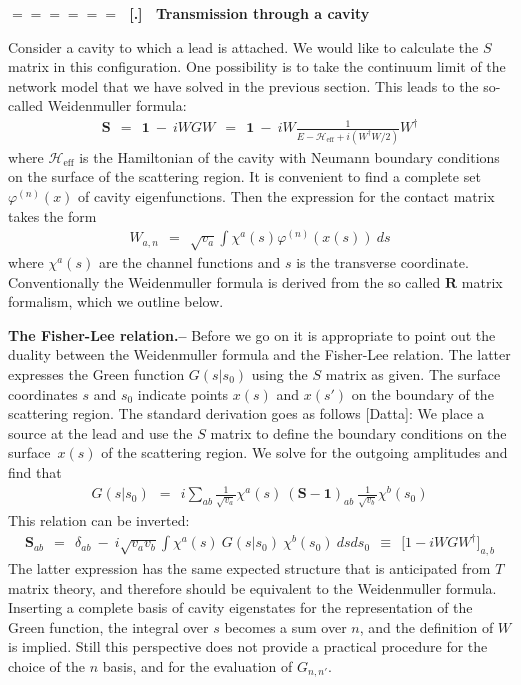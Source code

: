 \documentclass[onecolumn,fleqn]{revtex4}
\newcommand{\beq}{\begin{eqnarray}}
\newcommand{\eeq}{\end{eqnarray}}
\renewcommand{\thesubsection}{\arabic{subsection}}
\renewcommand{\thesubsubsection}{\arabic{subsubsection}}
\newcommand{\sheadC}[1]
{
\addtocounter{subsubsection}{1}
\vspace{5mm}
{\Large\bf $=\!=\!=\!=\!=\!=\;$ [\thesubsection.\thesubsubsection] \ #1}  
\nopagebreak
\phantomsection
}
\begin{document}
\sheadC{Transmission through a cavity}


Consider a cavity to which a lead is attached.
We would like to calculate the $S$ matrix in this configuration.  
One possibility is to take the continuum limit 
of the network model that we have solved in the
previous section. This leads to the so-called Weidenmuller formula:
\beq
\bm{S} 
\ \  = \ \ \bm{1} \ - \ iWGW 
\ \  = \ \ \bm{1} \ - \ i W \frac{1}{E-\mathcal{H}_{\text{eff}}+i(W^{\dag}W/2)} W^{\dag} 
\eeq
where $\mathcal{H}_{\text{eff}}$ is the Hamiltonian 
of the cavity with Neumann boundary conditions on the 
surface of the scattering region. It is convenient
to find a complete set $\varphi^{(n)}(x)$ 
of cavity eigenfunctions. Then the expression for 
the contact matrix takes the form 
\beq
W_{a,n} \ \ = \ \ \sqrt{v_a} \int  \chi^a(s) \varphi^{(n)}(x(s)) \ ds
\eeq
where $\chi^a(s)$ are the channel functions 
and $s$ is the transverse coordinate.
Conventionally the Weidenmuller formula is  
derived from the so called $\bm{R}$ matrix 
formalism, which we outline below. 


{\bf The Fisher-Lee relation.-- } 
Before we go on it is appropriate to point out 
the duality between the Weidenmuller formula
and the Fisher-Lee relation. 
The latter expresses the Green function $G(s|s_0)$
using the $S$ matrix as given. 
The surface coordinates $s$ and $s_0$ indicate 
points $x(s)$ and $x(s')$ on the boundary 
of the scattering region.  
 The standard derivation goes as follows [Datta]: 
We place a source at the lead and use the $S$ matrix 
to define the boundary conditions on the surface~$x(s)$  
of the scattering region. We solve for the outgoing 
amplitudes and find that 
\beq
G(s|s_0) \ \ = \ \  i\sum_{ab} 
\frac{1}{\sqrt{v_a}}\chi^a(s) 
\ (\bm{S}-\bm{1})_{ab} \  
\frac{1}{\sqrt{v_b}}\chi^b(s_0)      
\eeq
This relation can be inverted:
\beq
\bm{S}_{ab} 
\ \ = \ \ \delta_{ab} 
\ - \ i \sqrt{v_a v_b} 
\int \chi^a(s) \ G(s|s_0) \ \chi^b(s_0) 
\ ds ds_0
\ \ \equiv \ \ 
\Big[ 1 - iWGW^{\dag} \Big]_{a,b}  
\eeq
The latter expression has the same expected structure 
that is anticipated from $T$ matrix theory, 
and therefore should be equivalent to the Weidenmuller formula. 
Inserting a complete basis of cavity eigenstates for 
the representation of the Green function, 
the integral over $s$ becomes a sum over $n$,
and the definition of $W$ is implied. 
Still this perspective does not provide a practical 
procedure for the choice of the $n$ basis, 
and for the evaluation of $G_{n,n'}$. 
\end{document}
